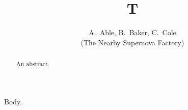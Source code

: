 \documentclass[preprint]{aastex}
\begin{document}
\title{T}
\author{
    A.~Able,
    B.~Baker,
    C.~Cole \\
    (The Nearby Supernova Factory)
}
\begin{abstract}
An abstract.
\end{abstract}
\maketitle
Body.
\end{document}
